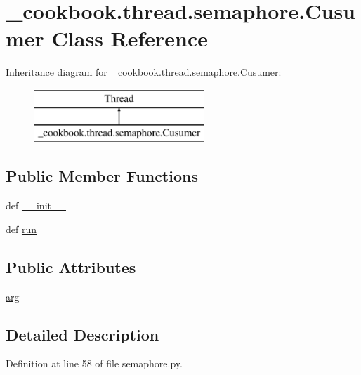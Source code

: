 \hypertarget{class__cookbook_1_1thread_1_1semaphore_1_1Cusumer}{\section{\-\_\-cookbook.\-thread.\-semaphore.\-Cusumer Class Reference}
\label{class__cookbook_1_1thread_1_1semaphore_1_1Cusumer}
}
Inheritance diagram for \-\_\-cookbook.\-thread.\-semaphore.\-Cusumer\-:\begin{figure}[H]
\begin{center}
\leavevmode
\includegraphics[height=2.000000cm]{de/dfa/class__cookbook_1_1thread_1_1semaphore_1_1Cusumer}
\end{center}
\end{figure}
\subsection*{Public Member Functions}
\begin{DoxyCompactItemize}
\item 
def \hyperlink{class__cookbook_1_1thread_1_1semaphore_1_1Cusumer_a2d0dfdb45b6d3e2e91ae80e813db1dc1}{\-\_\-\-\_\-init\-\_\-\-\_\-}
\item 
def \hyperlink{class__cookbook_1_1thread_1_1semaphore_1_1Cusumer_a6142eb28de70f5413dae68f02aef61e2}{run}
\end{DoxyCompactItemize}
\subsection*{Public Attributes}
\begin{DoxyCompactItemize}
\item 
\hyperlink{class__cookbook_1_1thread_1_1semaphore_1_1Cusumer_a7be67094634603b1b2a555144ad0c9aa}{arg}
\end{DoxyCompactItemize}


\subsection{Detailed Description}


Definition at line 58 of file semaphore.\-py.



